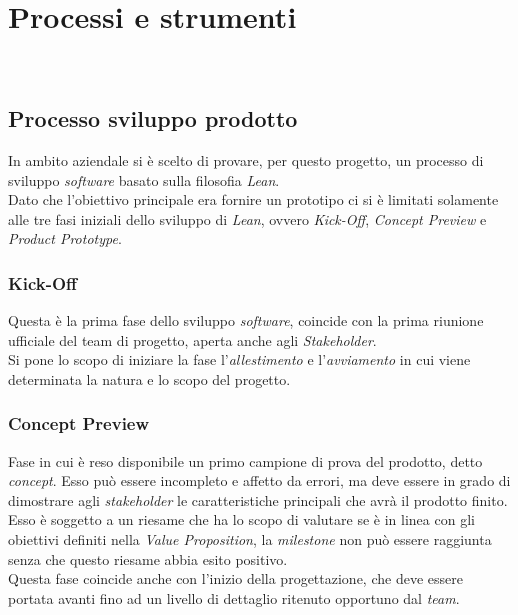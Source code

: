 
\chapter{Processi e strumenti}
\label{cap:processi-metodologie}

\\

\section{Processo sviluppo prodotto}
In ambito aziendale si è scelto di provare, per questo progetto, un processo di sviluppo \emph{software} basato sulla filosofia \emph{Lean}.\\
Dato che l'obiettivo principale era fornire un prototipo ci si è limitati solamente alle tre fasi iniziali dello sviluppo di \emph{Lean}, ovvero \emph{Kick-Off}, \emph{Concept Preview} e \emph{Product Prototype}.


\subsection{Kick-Off}
Questa è la prima fase dello sviluppo \emph{software}, coincide con la prima riunione ufficiale del team di progetto, aperta anche agli \emph{Stakeholder}.\\
Si pone lo scopo di iniziare la fase l'\emph{allestimento} e l'\emph{avviamento} in cui viene determinata la natura e lo scopo del progetto.\\

\subsection{Concept Preview}
Fase in cui è reso disponibile un primo campione di prova del prodotto, detto \emph{concept}. Esso può essere incompleto e affetto da errori, ma deve essere in grado di dimostrare agli \emph{stakeholder} le caratteristiche principali che avrà il prodotto finito.\\
Esso è soggetto a un riesame che ha lo scopo di valutare se è in linea con gli obiettivi definiti nella \emph{Value Proposition}, la \emph{milestone} non può essere raggiunta senza che questo riesame abbia esito positivo.\\
Questa fase coincide anche con l'inizio della progettazione, che deve essere portata avanti fino ad un livello di dettaglio ritenuto opportuno dal \emph{team}.\\

